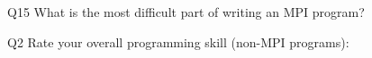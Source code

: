 \begin{description}%
\item{Q15} What is the most difficult part of writing an MPI program?%
\item{Q2} Rate your overall programming skill (non-MPI programs):%
\end{description}%
